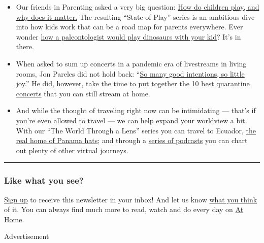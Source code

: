 \begin{itemize}
\item
  Our friends in Parenting asked a very big question:
  \href{https://www.nytimes.com/2020/07/21/parenting/the-state-of-play.html}{How
  do children play, and why does it matter.} The resulting ``State of
  Play'' series is an ambitious dive into how kids work that can be a
  road map for parents everywhere. Ever wonder
  \href{https://www.nytimes.com/2020/07/21/parenting/dinosaur-kids.html}{how
  a paleontologist would play dinosaurs with your kid}? It's in there.
\item
  When asked to sum up concerts in a pandemic era of livestreams in
  living rooms, Jon Pareles did not hold back:
  ``\href{https://www.nytimes.com/2020/07/21/arts/music/livestreams-intimacy.html}{So
  many good intentions, so little joy.}'' He did, however, take the time
  to put together the
  \href{https://www.nytimes.com/2020/07/21/arts/music/best-quarantine-concerts-livestream.html}{10
  best quarantine concerts} that you can still stream at home.
\item
  And while the thought of traveling right now can be intimidating ---
  that's if you're even allowed to travel --- we can help expand your
  worldview a bit. With our ``The World Through a Lens'' series you can
  travel to Ecuador,
  \href{https://www.nytimes.com/2020/07/20/travel/panama-hats-ecuador.html}{the
  real home of Panama hats}; and through a
  \href{https://www.nytimes.com/2020/07/18/at-home/coronavirus-travel-podcasts.html}{series
  of podcasts} you can chart out plenty of other virtual journeys.
\end{itemize}

\begin{center}\rule{0.5\linewidth}{\linethickness}\end{center}

\hypertarget{like-what-you-see}{%
\subsubsection{Like what you see?}\label{like-what-you-see}}

\href{https://www.nytimes.com/newsletters/at-home}{Sign up} to receive
this newsletter in your inbox! And let us know
\href{https://nyt.qualtrics.com/jfe/form/SV_e9cKGVFtci4CObz}{what you
think} of it. You can always find much more to read, watch and do every
day on \href{https://www.nytimes.com/spotlight/at-home}{At Home}.

Advertisement


